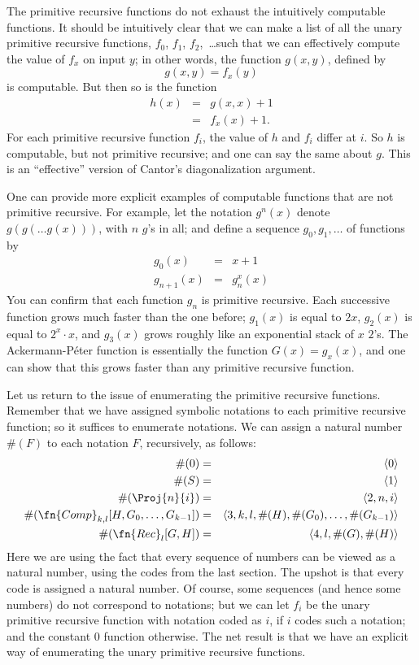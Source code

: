 \documentclass[../../../include/open-logic-section]{subfiles}
\begin{document}

The primitive recursive functions do not exhaust the intuitively
computable functions. It should be intuitively clear that we can make
a list of all the unary primitive recursive functions,
$f_0$, $f_1$, $f_2$,~\dots such that we can effectively compute the value of
$f_x$ on input $y$; in other words, the function $g(x,y)$, defined by
\[
g(x,y) = f_x(y)
\]
is computable. But then so is the function
\begin{eqnarray*}
h(x) & = & g(x,x) + 1 \\
& = & f_x(x) +1.
\end{eqnarray*}
For each primitive recursive function $f_i$, the value of $h$ and
$f_i$ differ at $i$. So $h$ is computable, but not primitive
recursive; and one can say the same about $g$. This is an
``effective'' version of Cantor's diagonalization argument.

One can provide more explicit examples of computable functions that
are not primitive recursive. For example, let the notation $g^n(x)$
denote $g(g(\dots g(x)))$, with $n$ $g$'s in all; and define a
sequence $g_0,g_1,\dots$ of functions by
\begin{eqnarray*}
g_0(x) & = & x+1 \\
g_{n + 1}(x) & = & g_n^x(x)
\end{eqnarray*}
You can confirm that each function $g_n$ is primitive recursive. Each
successive function grows much faster than the one before; $g_1(x)$ is
equal to $2x$, $g_2(x)$ is equal to $2^x \cdot x$, and $g_3(x)$ grows
roughly like an exponential stack of $x$ $2$'s. The Ackermann-P\'eter
function is essentially the function $G(x) = g_x(x)$, and one can show
that this grows faster than any primitive recursive function.

Let us return to the issue of enumerating the primitive recursive
functions. Remember that we have assigned symbolic notations to each
primitive recursive function; so it suffices to enumerate
notations. We can assign a natural number $\#(F)$ to each notation $F$,
recursively, as follows:
\begin{eqnarray*}
\#(0) & = & \langle 0 \rangle \\
\#(S) & = & \langle 1 \rangle \\
\#(\Proj{n}{i}) & = & \langle 2, n, i \rangle \\
\#(\fn{Comp}_{k,l}[H,G_0,\dots,G_{k-1}]) & = & \langle
3,k,l,\#(H),\#(G_0),\dots,\#(G_{k-1}) \rangle \\
\#(\fn{Rec}_l[G,H]) & = & \langle 4, l, \#(G), \#(H) \rangle
\end{eqnarray*}
Here we are using the fact that every sequence of numbers can be viewed
as a natural number, using the codes from the last section. The upshot
is that every code is assigned a natural number. Of course, some
sequences (and hence some numbers) do not correspond to notations; but
we can let $f_i$ be the unary primitive recursive function with
notation coded as $i$, if $i$ codes such a notation; and the constant
$0$ function otherwise. The net result is that we have an explicit way of
enumerating the unary primitive recursive functions.
\end{document}
